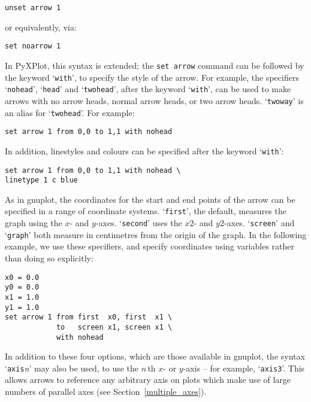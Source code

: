 \begin{verbatim}
unset arrow 1
\end{verbatim}

\noindent or equivalently, via:

\begin{verbatim}
set noarrow 1
\end{verbatim}

In PyXPlot, this syntax is extended; the \texttt{set arrow} command can be
followed by the keyword `\texttt{with}', to specify the style of the arrow. For
example, the specifiers `\texttt{nohead}', `\texttt{head}' and
`\texttt{twohead}', after the keyword `\texttt{with}', can be used to make
arrows with no arrow heads, normal arrow heads, or two arrow heads.
`\texttt{twoway}' is an alias for `\texttt{twohead}'.  For example:

\begin{verbatim}
set arrow 1 from 0,0 to 1,1 with nohead
\end{verbatim}

In addition, linestyles and colours can be specified after the keyword
`\texttt{with}':

\begin{verbatim}
set arrow 1 from 0,0 to 1,1 with nohead \
linetype 1 c blue
\end{verbatim}

As in gnuplot, the coordinates for the start and end points of the arrow can be
specified in a range of coordinate systems. `\texttt{first}', the default,
measures the graph using the $x$- and $y$-axes. `\texttt{second}' uses the $x2$-
and $y2$-axes. `\texttt{screen}' and `\texttt{graph}' both measure in centimetres
from the origin of the graph. In the following example, we use these
specifiers, and specify coordinates using variables rather than doing so
explicitly:

\begin{verbatim}
x0 = 0.0
y0 = 0.0
x1 = 1.0
y1 = 1.0
set arrow 1 from first  x0, first  x1 \
            to   screen x1, screen x1 \
            with nohead
\end{verbatim}

In addition to these four options, which are those available in gnuplot, the
syntax `\texttt{axis}\textit{n}' may also be used, to use the $n\,$th $x$- or
$y$-axis -- for example, `\texttt{axis3}'.\index{set arrow command@\texttt{set
arrow} command} This allows arrows to reference any arbitrary axis on plots
which make use of large numbers of parallel axes (see
Section~\ref{multiple_axes}).

